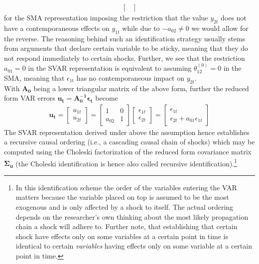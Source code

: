 \documentclass[a4paper,11pt,listof=nochaptergap,oneside,pointednumbers,bibtotoc,bigheadings,liststotoc]{scrbook}
\theoremstyle{mysatz}
\theoremstyle{mydefinition}
\theoremstyle{mybemerkung}
\newcommand{\vect}[1]{\boldsymbol{\mathbf{#1}}}
\begin{document}
\begin{itemize}
\begin{equation}
\begin{split}
\begin{bmatrix}
 						\end{bmatrix}
\end{split}								
\end{equation}
for the SMA representation imposing the restriction that the value $y_{2t}$ does not have a contemporaneous effects on $y_{1t}$ while due to $-a_{02} \neq 0$ we would allow for the reverse. The reasoning behind such an identification strategy usually stems from arguments that declare certain variable to be sticky, meaning that they do not respond immediately to certain shocks. Further, we see that the restriction $a_{01}=0$ in the SVAR representation is equivalent to assuming $\theta_{12}^{(0)}=0$ in the SMA, meaning that $\epsilon_{1t}$ has no contemporaneous impact on $y_{2t}$.\\
With $\vect{A_0}$ being a lower triangular matrix of the above form, further the reduced form VAR errors $\vect{u_t} = \vect{A_0^{-1}}\vect{\epsilon_t}$ become
\begin{equation} \label{eq:svar13}
\begin{split}
 		\vect{u_t} = \begin{bmatrix}
    					u_{1t} \\
					u_{2t} 
 					\end{bmatrix} = 
						\begin{bmatrix}
    						1 & 0 \\
						a_{02} & 1  
 						\end{bmatrix} 
							\begin{bmatrix}
    							\epsilon_{1t} \\
							\epsilon_{2t} 
 							\end{bmatrix} = 
								\begin{bmatrix}
    								\epsilon_{1t} \\
								\epsilon_{2t}+a_{01}\epsilon_{1t} 
 								\end{bmatrix} 			
\end{split}								
\end{equation}
The SVAR representation derived under above the assumption hence establishes a recursive causal ordering (i.e., a cascading causal chain of shocks) which may be computed using the Choleski factorization of the reduced form covariance matrix $\vect{\Sigma_u}$ (the Choleski identification is hence also called recursive identification).\footnote{In this identification scheme the order of the variables entering the VAR matters because the variable placed on top is assumed to be the most exogenous and is only affected by a shock to itself. The actual ordering depends on the researcher's own thinking about the most likely propagation chain a shock will adhere to. Further note, that establishing that certain shock have effects only on some variables at a certain point in time is identical to certain \textit{variables} having effects only on some variable at a certain point in time.} 

\end{itemize}
\end{document}
